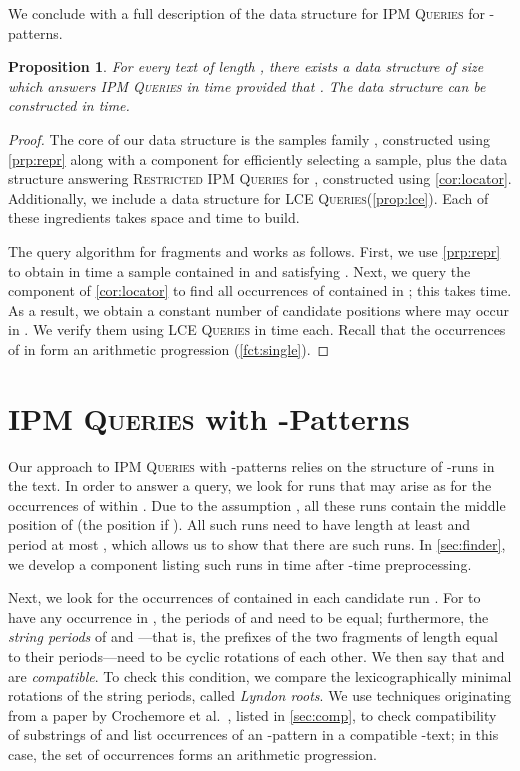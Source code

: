 \documentclass[a4paper]{article}
\newtheorem{proposition}[theorem]{Proposition}
\theoremstyle{definition}
\theoremstyle{remark}
\newcommand{\IPM}{\textsc{IPM Queries}\xspace}
\newcommand{\RIPM}{\textsc{Restricted IPM Queries}\xspace}
\newcommand{\LCEQ}{\textsc{LCE Queries}\xspace}
\newcommand{\maybeqed}{}
\begin{document}
We conclude with a full description of the data structure for \IPM for -patterns.
\begin{proposition}\label{prp:ipm}
  For every text  of length , there exists a data structure of size  which answers \IPM in  time provided that . The data structure can be constructed in  time.
\end{proposition}
\begin{proof}
  The core of our data structure is the samples family , constructed
  using \cref{prp:repr} along with a component for efficiently selecting a sample,
  plus the data structure answering \RIPM for , constructed using \cref{cor:locator}.
  Additionally, we include a data structure for \LCEQ (\cref{prop:lce}).
  Each of these ingredients takes  space and  time to build. 
  
  The query algorithm for fragments  and  works as follows.
  First, we use \cref{prp:repr} to obtain in  time a sample  contained in  and satisfying .
   Next, we query the component of \cref{cor:locator} to find all occurrences of  contained in ;
   this takes  time.
  As a result, we obtain a constant number of candidate positions where  may occur in .
  We verify them using \LCEQ in  time each.
  Recall that the occurrences of  in  form an arithmetic progression (\cref{fct:single}).
  \maybeqed \end{proof}

\section{\IPM with -Patterns}\label{chp:per}

Our approach to \IPM with -patterns relies on the structure of -runs in the text. In order to answer a query, we look for runs that may arise as  for the occurrences  of  within .
Due to the assumption , all these runs contain the middle position of   (the position  if  ).
All such runs need to have length at least  and period at most , which allows us to show that there are  such runs.
In \cref{sec:finder}, we develop a component listing such runs in  time after -time preprocessing.

 Next, we look for the occurrences of  contained in each candidate run .
 For  to have any occurrence in , the periods of  and  need to be equal;
 furthermore, the \emph{string periods} of  and ---that is, the prefixes of the two fragments of length equal to their periods---need to be cyclic rotations of each other.
 We then say that  and  are \emph{compatible}.
 To check this condition, we compare the lexicographically minimal rotations of the string periods, called \emph{Lyndon roots}.
 We use techniques originating from a paper by Crochemore et al.~\cite{DBLP:journals/tcs/CrochemoreIKRRW14}, listed in \cref{sec:comp},
 to check compatibility of substrings of  and list occurrences of an -pattern in a compatible -text;
 in this case, the set of occurrences forms an arithmetic progression.
 
\end{document}
